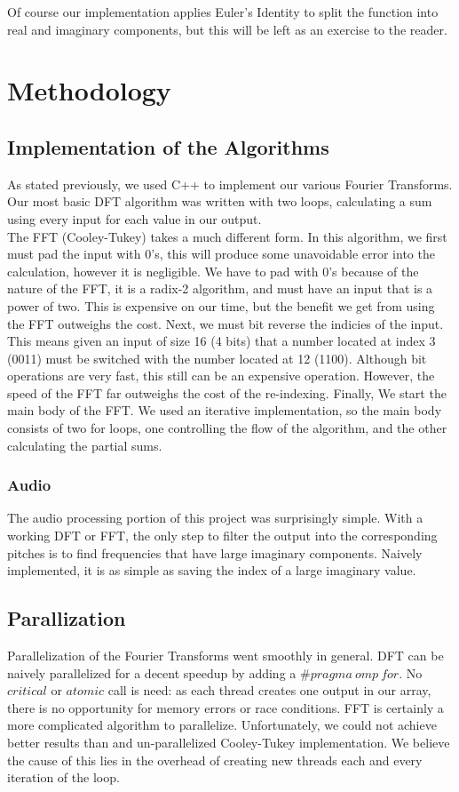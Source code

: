 \documentclass[12pt]{extarticle}
\begin{document}
    Of course our implementation applies Euler's Identity to split the function into real and imaginary components, but this will be left as an exercise to the reader.

\section*{Methodology}

	\subsection*{Implementation of the Algorithms}
		As stated previously, we used C++ to implement our various Fourier Transforms.
		Our most basic DFT algorithm was written with two loops, calculating a sum using every input for each value in our output.
		\\

		The FFT (Cooley-Tukey) takes a much different form.
		In this algorithm, we first must pad the input with 0's, this will produce some unavoidable error into the calculation, however it is negligible.
		We have to pad with 0's because of the nature of the FFT, it is a radix-2 algorithm, and must have an input that is a power of two.
		This is expensive on our time, but the benefit we get from using the FFT outweighs the cost.
		Next, we must bit reverse the indicies of the input.
		This means given an input of size 16 (4 bits) that a number located at index 3 (0011) must be switched with the number located at 12 (1100).
		Although bit operations are very fast, this still can be an expensive operation. 
		However, the speed of the FFT far outweighs the cost of the re-indexing.
		Finally, We start the main body of the FFT.
		We used an iterative implementation, so the main body consists of two for loops, one controlling the flow of the algorithm, and the other calculating the partial sums.
	
	\subsubsection*{Audio}
		The audio processing portion of this project was surprisingly simple. 
		With a working DFT or FFT, the only step to filter the output into the corresponding pitches is to find frequencies that have large imaginary components.
		Naively implemented, it is as simple as saving the index of a large imaginary value.

\subsection*{Parallization} 
    Parallelization of the Fourier Transforms went smoothly in general.
    DFT can be naively parallelized for a decent speedup by adding a $\#pragma\ omp\ for$.
    No $critical$ or $atomic$ call is need: as each thread creates one output in our array, there is no opportunity for memory errors or race conditions.
    FFT is certainly a more complicated algorithm to parallelize. 
    Unfortunately, we could not achieve better results than and un-parallelized Cooley-Tukey implementation.
    We believe the cause of this lies in the overhead of creating new threads each and every iteration of the loop.
   
\end{document}
